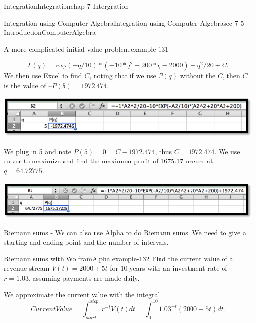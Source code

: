 \documentclass[oneside,10pt,]{book}
\numberwithin{equation}{section}
\begin{document}
\begin{chapterptx}{Integration}{}{Integration}{}{}{chap-7-Intergration}
\begin{sectionptx}{Integration using Computer Algebra}{}{Integration using Computer Algebra}{}{}{sec-7-5-IntroductionComputerAlgebra}
\begin{example}{A more complicated initial value problem.}{example-131}
\begin{sidebyside}{1}{0.15}{0.15}{0}
\begin{sbspanel}{0.7}
\end{sbspanel}%
\end{sidebyside}%
%
\begin{equation*}
P(q) = exp(-q/10)*(-10*q^2-200*q-2000)-q^2/20+C.
\end{equation*}
\hypertarget{p-2910}{}%
We then use Excel to find \(C\), noting that if we use \(P(q)\) without the \(C\), then \(C\) is the value of \(–P(5) = 1972.474\).%
\begin{sidebyside}{1}{0.15}{0.15}{0}%
\begin{sbspanel}{0.7}%
\includegraphics[width=1\linewidth]{images/sec7-5-21.png}
\end{sbspanel}%
\end{sidebyside}%
\par
\hypertarget{p-2911}{}%
We plug in 5 and note \(P(5) = 0 = C-1972.474\), thus \(C = 1972.474\).  We use solver to maximize and find the maximum profit of \textdollar{}1675.17 occurs at \(q=64.72775\).%
\begin{sidebyside}{1}{0.05}{0.05}{0}%
\begin{sbspanel}{0.9}%
\includegraphics[width=1\linewidth]{images/sec7-5-22.png}
\end{sbspanel}%
\end{sidebyside}%
\end{example}
\hypertarget{p-2912}{}%
Riemann sums - We can also use Alpha to do Riemann sums.  We need to give a starting and ending point and the number of intervals.%
\begin{example}{Riemann sums with Wolfram\textbar{}Alpha.}{example-132}%
\hypertarget{p-2913}{}%
Find the current value of a revenue stream \(V(t)=2000+5t\) for 10 years with an investment rate of \(r=1.03\), assuming payments are made daily.%
\par
\hypertarget{p-2914}{}%
We approximate the current value with the integral%
%
\begin{equation*}
CurrentValue=\int_{start}^{stop} r^{-t} V(t)dt= \int_0^{10} 1.03^{-t} (2000+5t)dt.
\end{equation*}

\end{example}
\end{sectionptx}
\end{chapterptx}
\end{document}

